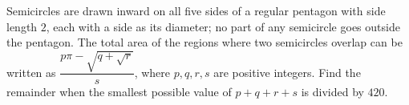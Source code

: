 Semicircles are drawn inward on all five sides of a regular pentagon with side length $2$, each with a side as its diameter; no part of any semicircle goes outside the pentagon. The total area of the regions where two semicircles overlap can be written as $\dfrac{p\pi-\sqrt{q+\sqrt{r}}}{s}$, where $p,q,r,s$ are positive integers. Find the remainder when the smallest possible value of $p+q+r+s$ is divided by $420$.
